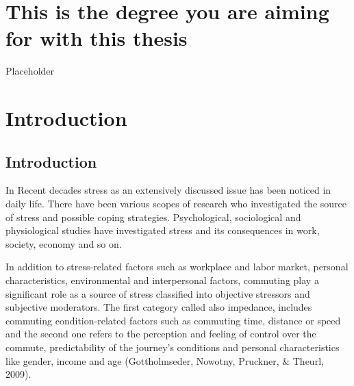 \documentclass[
11pt, %
oneside, %
english, %
singlespacing, %
]{macthesis} %
\begin{document}



\label{lastoffront}
\clearpage


\mainmatter %
\pagestyle{thesis}
\hypertarget{this-is-the-degree-you-are-aiming-for-with-this-thesis}{%
\chapter{This is the degree you are aiming for with this thesis}\label{this-is-the-degree-you-are-aiming-for-with-this-thesis}}

Placeholder

\hypertarget{introduction}{%
\chapter{Introduction}\label{introduction}}

\hypertarget{introduction-1}{%
\section{Introduction}\label{introduction-1}}

In Recent decades stress as an extensively discussed issue has been noticed in daily life. There have been various scopes of research who investigated the source of stress and possible coping strategies. Psychological, sociological and physiological studies have investigated stress and its consequences in work, society, economy and so on.

In addition to stress-related factors such as workplace and labor market, personal characteristics, environmental and interpersonal factors, commuting play a significant role as a source of stress classified into objective stressors and subjective moderators. The first category called also impedance, includes commuting condition-related factors such as commuting time, distance or speed and the second one refers to the perception and feeling of control over the commute, predictability of the journey's conditions and personal characteristics like gender, income and age (Gottholmseder, Nowotny, Pruckner, \& Theurl, 2009).
\end{document}
